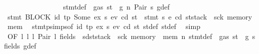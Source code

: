 \begin{isabellebody}
\ \ \ \ \ \ \ \ \ \ \ \ \ \ \isamarkupfalse%
\ {}{}{\isacharparenleft}{\kern0pt}{}{\isacharparenright}{\kern0pt}\ stmt{\isacharunderscore}{\kern0pt}def\ {\isacharbackquoteopen}{\isasymnot}\ gas\ st\ {\isasymle}\ g{\isacharbackquoteclose}\ n\ Pair\ s{}\ g{\isacharunderscore}{\kern0pt}def\ \isamarkupfalse%
\ {\isachardoublequoteopen}stmt\ {\isacharparenleft}{\kern0pt}BLOCK\ {\isacharparenleft}{\kern0pt}{\isacharparenleft}{\kern0pt}id{}{\isacharcomma}{\kern0pt}\ tp{\isacharparenright}{\kern0pt}{\isacharcomma}{\kern0pt}\ Some\ ex{\isacharprime}{\kern0pt}{\isacharparenright}{\kern0pt}\ s{\isacharparenright}{\kern0pt}\ e\isactrlsub v\ cd\ st\ {\isacharequal}{\kern0pt}\ stmt\ s\ e{\isacharprime}{\kern0pt}\ cd{\isacharprime}{\kern0pt}\ {\isacharparenleft}{\kern0pt}st{\isacharprime}{\kern0pt}{\isacharprime}{\kern0pt}{\isasymlparr}stack\ {\isacharcolon}{\kern0pt}{\isacharequal}{\kern0pt}\ sck{\isacharprime}{\kern0pt}{\isacharcomma}{\kern0pt}\ memory\ {\isacharcolon}{\kern0pt}{\isacharequal}{\kern0pt}\ mem{\isacharprime}{\kern0pt}{\isasymrparr}{\isacharparenright}{\kern0pt}{\isachardoublequoteclose}\ \isamarkupfalse%
\ stmt{\isachardot}{\kern0pt}psimps{\isacharparenleft}{\kern0pt}{}{}{\isacharparenright}{\kern0pt}{\isacharbrackleft}{\kern0pt}of\ id{}\ tp\ ex{\isacharprime}{\kern0pt}\ s\ e\isactrlsub v\ cd\ st{\isacharbrackright}{\kern0pt}\ st{\isacharprime}{\kern0pt}{\isacharunderscore}{\kern0pt}def\ st{\isacharprime}{\kern0pt}{\isacharprime}{\kern0pt}{\isacharunderscore}{\kern0pt}def\ \isamarkupfalse%
\ simp\isanewline
\ \ \ \ \ \ \ \ \ \ \ \ \ \ \isamarkupfalse%
\ {}{}{\isacharparenleft}{\kern0pt}{}{\isacharparenright}{\kern0pt}{\isacharbrackleft}{\kern0pt}OF\ l{}\ l{}\ l{}\ Pair\ l{}\ fields{\isacharcomma}{\kern0pt}\ \ s{\isacharprime}{\kern0pt}d{\isacharequal}{\kern0pt}{\isachardoublequoteopen}st{\isacharprime}{\kern0pt}{\isacharprime}{\kern0pt}{\isasymlparr}stack\ {\isacharcolon}{\kern0pt}{\isacharequal}{\kern0pt}\ sck{\isacharprime}{\kern0pt}{\isacharcomma}{\kern0pt}\ memory\ {\isacharcolon}{\kern0pt}{\isacharequal}{\kern0pt}\ mem{\isacharprime}{\kern0pt}{\isasymrparr}{\isachardoublequoteclose}{\isacharbrackright}{\kern0pt}\ n\ stmt{\isacharunderscore}{\kern0pt}def\ {\isacharbackquoteopen}{\isasymnot}\ gas\ st\ {\isasymle}\ g{\isacharbackquoteclose}\ s{}\ fields\ g{\isacharunderscore}{\kern0pt}def\ \isamarkupfalse%

\end{isabellebody}
